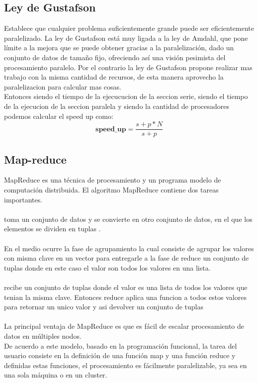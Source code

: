 \subsection{Ley de Gustafson}

Establece que cualquier problema suficientemente grande puede ser eficientemente
paralelizado. La ley de Gustafson está muy ligada a la ley de Amdahl, que pone
límite a la mejora que se puede obtener gracias a la paralelización, dado un
conjunto de datos de tamaño fijo, ofreciendo así una visión pesimista del
procesamiento paralelo. Por el contrario la ley de Gustafson  propone realizar
mas trabajo con la misma cantidad de recursos, de esta manera aprovecho la
paralelizacion para calcular mas cosas.\\

Entonces siendo  el tiempo de la ejecucucion de la seccion serie, siendo
 el tiempo de la ejecucion de la seccion paralela y siendo  la
cantidad de procesadores podemos calcular el speed up como:
\begin{equation}
    \textbf{speed\_up} = \dfrac{s+p*N}{s+p}
\end{equation}

\subsection{Map-reduce}

MapReduce es una técnica de procesamiento y un programa modelo de computación
distribuida. El algoritmo MapReduce contiene dos tareas importantes.\\\\
 toma un conjunto de datos y se convierte en otro conjunto de datos, en el
que los elementos se dividen en tuplas .\\\\
En el medio ocurre la fase de agrupamiento la cual consiste de agrupar los valores
con misma clave en un vector para entregarle a la fase de reduce un conjunto de
tuplas  donde en este caso el valor son todos los valores
en una lista.\\\\
 recibe un conjunto de tuplas  donde el valor
es una lista de todos los valores que tenian la misma clave. Entonces reduce
aplica una funcion a todos estos valores para retornar un unico valor y asi
devolver un conjunto de tuplas \\\\
La principal ventaja de MapReduce es que es fácil de escalar procesamiento de
datos en múltiples nodos.\\
De acuerdo a este modelo, basado en la programación funcional, la tarea del
usuario consiste en la definición de una función map y una función reduce y
definidas estas funciones, el procesamiento es fácilmente paralelizable, ya sea
en una sola máquina o en un cluster.\\

